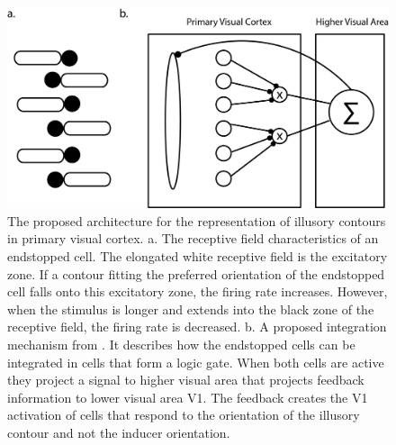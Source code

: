\documentclass[12pt]{article}
\begin{document}
\begin{figure}[H]
  \centering
  \includegraphics[width=1.0 \textwidth]{adjusted_figures/endstop_mechanism.png}
  \caption{The proposed architecture for the representation of illusory contours in primary visual cortex. a. The receptive field characteristics of an endstopped cell. The elongated white receptive field is the excitatory zone. If a contour fitting the preferred orientation of the endstopped cell falls onto this excitatory zone, the firing rate increases. However, when the stimulus is longer and extends into the black zone of the receptive field, the firing rate is decreased. b. A proposed integration mechanism from \textcite{vonderheydtIllusoryContoursCortical1984}. It describes how the endstopped cells can be integrated in cells that form a logic gate. When both cells are active they project a signal to higher visual area that projects feedback information to lower visual area V1. The feedback creates the V1 activation of cells that respond to the orientation of the illusory contour and not the inducer orientation.}
  \label{fig:endstop_mechanism}
\end{figure}
\end{document}
